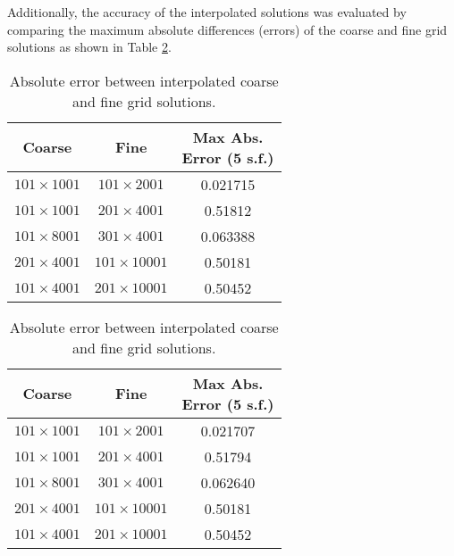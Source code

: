 Additionally, the accuracy of the interpolated solutions was evaluated by comparing the maximum absolute differences (errors) of the coarse and fine grid solutions as shown in Table \ref{tab:interpolation-error}.

\begin{table}[H]
    \centering
    \begin{minipage}{0.48\textwidth}
        \centering
        \begin{tabular}{|c|c|c|}
            \hline
            \textbf{Coarse} & \textbf{Fine} & \makecell{\textbf{Max Abs.}\\\textbf{Error (5 s.f.)}} \\
            \hline
            $101 \times 1001$ & $101 \times 2001$ & 0.021715 \\ \hline
            $101 \times 1001$ & $201 \times 4001$ & 0.51812 \\ \hline
            $101 \times 8001$ & $301 \times 4001$ & 0.063388 \\ \hline
            $201 \times 4001$ & $101 \times 10001$ & 0.50181 \\ \hline
            $101 \times 4001$ & $201 \times 10001$ & 0.50452 \\ \hline
        \end{tabular}
        \label{tab:interpolation-explicit}
    \end{minipage}
    \hfill
    \begin{minipage}{0.48\textwidth}
        \centering
        \begin{tabular}{|c|c|c|}
            \hline
            \textbf{Coarse} & \textbf{Fine} & \makecell{\textbf{Max Abs.}\\\textbf{Error (5 s.f.)}} \\
            \hline
            $101 \times 1001$ & $101 \times 2001$ & 0.021707 \\ \hline
            $101 \times 1001$ & $201 \times 4001$ & 0.51794 \\ \hline
            $101 \times 8001$ & $301 \times 4001$ & 0.062640 \\ \hline
            $201 \times 4001$ & $101 \times 10001$ & 0.50181 \\ \hline
            $101 \times 4001$ & $201 \times 10001$ & 0.50452 \\ \hline
        \end{tabular}
        \label{tab:interpolation-cn}
    \end{minipage}
    \caption{Absolute error between interpolated coarse and fine grid solutions.}
    \label{tab:interpolation-error}
\end{table}

